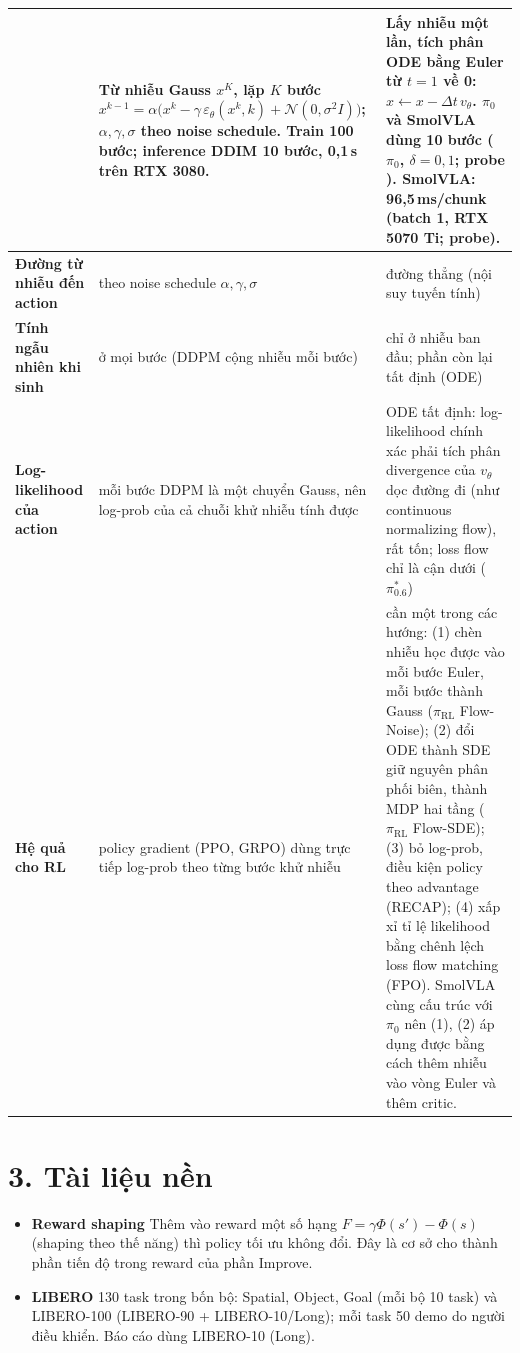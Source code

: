 \documentclass[9pt,a4paper]{extarticle}
\newcommand{\code}[1]{\texttt{\detokenize{#1}}}
\begin{document}
{\begin{longtable}{@{}L{3.0cm} L{10.8cm} L{10.8cm}@{}}
& Từ nhiễu Gauss $x^K$, lặp $K$ bước $x^{k-1}=\alpha\big(x^k-\gamma\,\varepsilon_\theta(x^k,k)+\mathcal{N}(0,\sigma^2I)\big)$; $\alpha,\gamma,\sigma$ theo noise schedule. Train 100 bước; inference DDIM 10 bước, 0,1\,s trên RTX 3080.
& Lấy nhiễu một lần, tích phân ODE bằng Euler từ $t=1$ về 0: $x\leftarrow x-\Delta t\,v_\theta$. $\pi_0$ và SmolVLA dùng 10 bước ($\pi_0$, $\delta=0{,}1$; probe \code{num_steps = 10}). SmolVLA: 96,5\,ms/chunk (batch 1, RTX 5070 Ti; probe). \\
\midrule
\textbf{Đường từ nhiễu đến action}
& theo noise schedule $\alpha,\gamma,\sigma$
& đường thẳng (nội suy tuyến tính) \\
\midrule
\textbf{Tính ngẫu nhiên khi sinh}
& ở mọi bước (DDPM cộng nhiễu mỗi bước)
& chỉ ở nhiễu ban đầu; phần còn lại tất định (ODE) \\
\midrule
\textbf{Log-likelihood của action}
& mỗi bước DDPM là một chuyển Gauss, nên log-prob của cả chuỗi khử nhiễu tính được
& ODE tất định: log-likelihood chính xác phải tích phân divergence của $v_\theta$ dọc đường đi (như continuous normalizing flow), rất tốn; loss flow chỉ là cận dưới ($\pi^*_{0.6}$) \\
\midrule
\textbf{Hệ quả cho RL}
& policy gradient (PPO, GRPO) dùng trực tiếp log-prob theo từng bước khử nhiễu
& cần một trong các hướng: (1) chèn nhiễu học được vào mỗi bước Euler, mỗi bước thành Gauss ($\pi_{\text{RL}}$ Flow-Noise); (2) đổi ODE thành SDE giữ nguyên phân phối biên, thành MDP hai tầng ($\pi_{\text{RL}}$ Flow-SDE); (3) bỏ log-prob, điều kiện policy theo advantage (RECAP); (4) xấp xỉ tỉ lệ likelihood bằng chênh lệch loss flow matching (FPO). SmolVLA cùng cấu trúc với $\pi_0$ nên (1), (2) áp dụng được bằng cách thêm nhiễu vào vòng Euler và thêm critic. \\
\end{longtable}}

\section*{3. Tài liệu nền}
\begin{itemize}
\item \textbf{Reward shaping} Thêm vào reward một số hạng $F=\gamma\Phi(s')-\Phi(s)$ (shaping theo
thế năng) thì policy tối ưu không đổi. Đây là cơ sở cho thành phần tiến độ trong reward của phần Improve.
\item \textbf{LIBERO} 130 task trong bốn bộ: Spatial, Object, Goal (mỗi bộ 10 task) và LIBERO-100
(LIBERO-90 + LIBERO-10/Long); mỗi task 50 demo do người điều khiển. Báo cáo dùng LIBERO-10 (Long).
\end{itemize}
\end{document}
